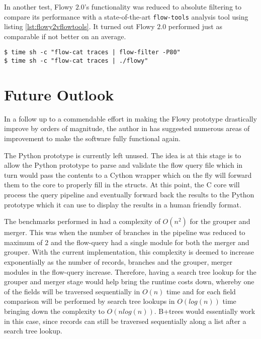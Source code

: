 In another test, Flowy $2.0$'s functionality was reduced to absolute filtering
 to compare its performance with a
state-of-the-art \texttt{flow-tools} analysis tool using
listing \ref{lst:flowy2vflowtools}. It turned out Flowy $2.0$ performed just as
comparable if not better on an average.

\begin{lstlisting}
$ time sh -c "flow-cat traces | flow-filter -P80"
$ time sh -c "flow-cat traces | ./flowy"
\end{lstlisting}


\section{Future Outlook}\label{sec:flowy2-future}

In a follow up to a commendable effort in making the Flowy prototype
drastically improve by orders of magnitude, the author in
\cite{jschauer:thesis:2011} has suggested numerous areas of improvement to
make the software fully functional again.

The Python prototype is currently left unused. The idea is at this stage is to
allow the Python prototype to parse and validate the flow query file which in
turn would pass the contents to a Cython wrapper which on the fly will forward
them  to the core to properly fill in the
structs. At this point, the C core will process the query pipeline and
eventually forward back the results to the Python prototype which it can use
to display the results in a human friendly format.

The benchmarks performed in \cite{jschauer:thesis:2011} had a complexity of
$O(n^2)$ for the grouper and merger. This was when the number of branches in
the pipeline was reduced to maximum of $2$ and the flow-query had a single
module for both the merger and grouper. With the current implementation, this
complexity is deemed to increase exponentially as the number of records,
branches and the grouper, merger modules in the flow-query increase.
 Therefore, having a search tree lookup for
the grouper and merger stage would help bring the runtime costs down, whereby
one of the fields will be traversed sequentially in $O(n)$ time and for each
field comparison will be performed by search tree lookups in $O(log(n))$ time
bringing down the complexity to $O(nlog(n))$. B+trees would essentially work
in this case, since records can still be traversed sequentially along a list
after a search tree lookup.

